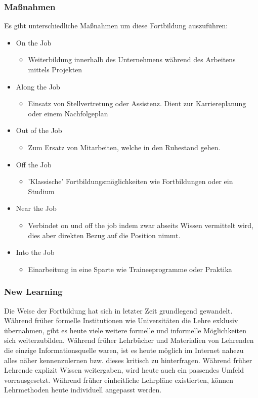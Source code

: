 \documentclass{article}
\begin{document}
	 \subsubsection{Maßnahmen}
	 Es gibt unterschiedliche Maßnahmen um diese Fortbildung auszuführen:
	 \begin{itemize}
	 	\item{On the Job}
	 	\begin{itemize}
	 		\item{Weiterbildung innerhalb des Unternehmens während des Arbeitens mittels Projekten}
	 	\end{itemize}
	 	\item{Along the Job}
	 	\begin{itemize}
	 		\item{Einsatz von Stellvertretung oder Assistenz. Dient zur Karriereplanung oder einem Nachfolgeplan}
	 	\end{itemize}
	 	\item{Out of the Job}
	 	\begin{itemize}
	 		\item{Zum Ersatz von Mitarbeiten, welche in den Ruhestand gehen.}
	 	\end{itemize}
	 	\item{Off the Job}
	 	\begin{itemize}
	 		\item{'Klassische' Fortbildungsmöglichkeiten wie Fortbildungen oder ein Studium}
	 	\end{itemize}
	 	\item{Near the Job}
	 	\begin{itemize}
	 		\item{Verbindet on und off the job indem zwar abseits Wissen vermittelt wird, dies aber direkten Bezug auf die Position nimmt.}
	 	\end{itemize}
	 	\item{Into the Job}
	 	\begin{itemize}
	 		\item{Einarbeitung in eine Sparte wie Traineeprogramme oder Praktika}
	 	\end{itemize}
	 \end{itemize}
	 \subsubsection{New Learning}
	 Die Weise der Fortbildung hat sich in letzter Zeit grundlegend gewandelt. Während früher formelle Institutionen wie Universitäten die Lehre exklusiv übernahmen, gibt es heute viele weitere formelle und informelle Möglichkeiten sich weiterzubilden. Während früher Lehrbücher und Materialien von Lehrenden die einzige Informationsquelle waren, ist es heute möglich im Internet nahezu alles näher kennenzulernen bzw. dieses kritisch zu hinterfragen. Während früher Lehrende explizit Wissen weitergaben, wird heute auch ein passendes Umfeld vorrausgesetzt. Während früher einheitliche Lehrpläne existierten, können Lehrmethoden heute individuell angepasst werden.
\end{document}
